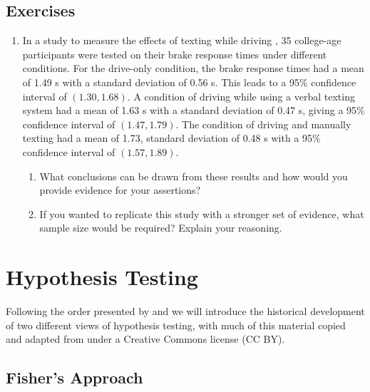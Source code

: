 \documentclass[
]{book}
\providecommand{\tightlist}{%
  \setlength{\itemsep}{0pt}\setlength{\parskip}{0pt}}
\theoremstyle{definition}
\theoremstyle{definition}
\theoremstyle{definition}
\theoremstyle{definition}
\theoremstyle{remark}
\begin{document}
\hypertarget{exercises-70}{%
\subsection{Exercises}\label{exercises-70}}

\begin{enumerate}
\def\labelenumi{\arabic{enumi}.}
\item
  In a study to measure the effects of texting while driving \citep{He2014}, 35 college-age participants were tested on their brake response times under different conditions. For the drive-only condition, the brake response times had a mean of 1.49 s with a standard deviation of 0.56 s. This leads to a 95\% confidence interval of \((1.30,1.68)\). A condition of driving while using a verbal texting system had a mean of 1.63 s with a standard deviation of 0.47 s, giving a 95\% confidence interval of \((1.47,1.79)\). The condition of driving and manually texting had a mean of 1.73, standard deviation of 0.48 s with a 95\% confidence interval of \((1.57, 1.89)\).

  \begin{enumerate}
  \def\labelenumii{\alph{enumii}.}
  \tightlist
  \item
    What conclusions can be drawn from these results and how would you provide evidence for your assertions?
  \item
    If you wanted to replicate this study with a stronger set of evidence, what sample size would be required? Explain your reasoning.
  \end{enumerate}
\end{enumerate}

\hypertarget{hypothesis-testing}{%
\section{Hypothesis Testing}\label{hypothesis-testing}}

Following the order presented by \citet{Macdonald1997} and \citet{Perezgonzalez2015} we will introduce the historical development of two different views of hypothesis testing, with much of this material copied and adapted from \citet{Perezgonzalez2015} under a Creative Commons license (CC BY).

\hypertarget{fishers-approach}{%
\subsection{Fisher's Approach}\label{fishers-approach}}
\end{document}
